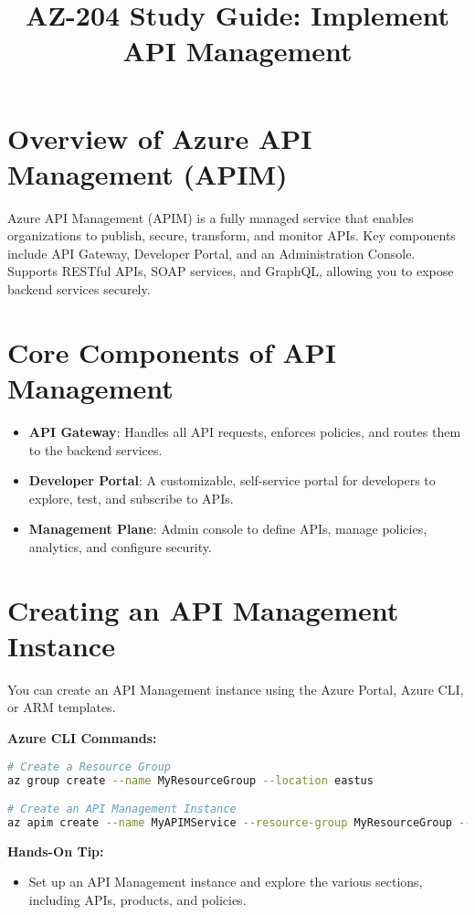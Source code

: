 \documentclass{article}
\title{AZ-204 Study Guide: Implement API Management}
\author{}
\date{}
\begin{document}
\maketitle

\section{Overview of Azure API Management (APIM)}
Azure API Management (APIM) is a fully managed service that enables organizations to publish, secure, transform, and monitor APIs. Key components include API Gateway, Developer Portal, and an Administration Console. Supports RESTful APIs, SOAP services, and GraphQL, allowing you to expose backend services securely.

\section{Core Components of API Management}
\begin{itemize}
    \item \textbf{API Gateway}: Handles all API requests, enforces policies, and routes them to the backend services.
    \item \textbf{Developer Portal}: A customizable, self-service portal for developers to explore, test, and subscribe to APIs.
    \item \textbf{Management Plane}: Admin console to define APIs, manage policies, analytics, and configure security.
\end{itemize}

\section{Creating an API Management Instance}
You can create an API Management instance using the Azure Portal, Azure CLI, or ARM templates.

\textbf{Azure CLI Commands:}
\begin{lstlisting}[language=bash]
# Create a Resource Group
az group create --name MyResourceGroup --location eastus

# Create an API Management Instance
az apim create --name MyAPIMService --resource-group MyResourceGroup --publisher-email "admin@example.com" --publisher-name "MyCompany"
\end{lstlisting}

\textbf{Hands-On Tip:}
\begin{itemize}
    \item Set up an API Management instance and explore the various sections, including APIs, products, and policies.
\end{itemize}
\end{document}
